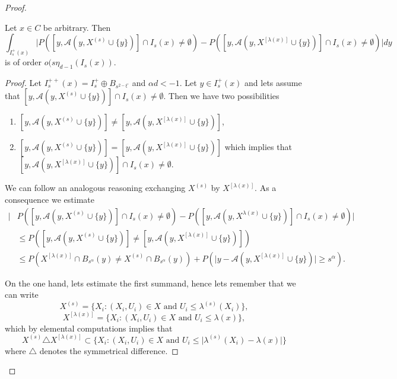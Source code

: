 \begin{proof}
\begin{lem}\label{lem2.5} Let $x\in C$ be arbitrary. Then 
\small $$\int_{I^+_s(x)}\vert P([y, \mathcal{A}(y,X^{(s)}\cup\lbrace y\rbrace)]\cap I_s(x)\neq \emptyset)-P([y, \mathcal{A}(y,X^{[\lambda(x)]}\cup\lbrace y\rbrace)]\cap I_s(x)\neq \emptyset)\vert dy$$
\normalsize
is of order $o(s\eta_{d-1}(I_s(x))$.
\end{lem}
\begin{proof}
Let $I_s^{++}(x)=I_s^+\oplus B_{s^{2-\xi'}}$ and $\alpha d<-1$. Let $y\in I_s^+(x)$ and lets assume that $[y, \mathcal{A}(y,X^{(s)}\cup\lbrace y\rbrace)]\cap I_s(x)\neq \emptyset$. Then we have two possibilities
\begin{enumerate}
\item $[y, \mathcal{A}(y,X^{(s)}\cup\lbrace y\rbrace)]\neq [y, \mathcal{A}(y,X^{[\lambda (x)]}\cup\lbrace y\rbrace)]$,
\item $[y, \mathcal{A}(y,X^{(s)}\cup\lbrace y\rbrace)]= [y, \mathcal{A}(y,X^{[\lambda (x)]}\cup\lbrace y\rbrace)]$ which implies that\\ $[y, \mathcal{A}(y,X^{[\lambda (x)]}\cup\lbrace y\rbrace)]\cap I_s(x)\neq \emptyset$.
\end{enumerate}
We can follow an analogous reasoning exchanging $X^{(s)}$ by $X^{[\lambda (x)]}$. As a consequence we estimate
\begin{align}
\vert &P([y, \mathcal{A}(y,X^{(s)}\cup\lbrace y\rbrace)]\cap I_s(x)\neq \emptyset)-P([y, \mathcal{A}(y,X^{\lambda(x)}\cup\lbrace y\rbrace)]\cap I_s(x)\neq \emptyset)\vert\nonumber\\
&\leq P([y, \mathcal{A}(y,X^{(s)}\cup\lbrace y\rbrace)]\neq [y, \mathcal{A}(y,X^{[\lambda (x)]}\cup\lbrace y\rbrace)])\nonumber\\
&\leq P(X^{[\lambda (x)]}\cap B_{s^\alpha}(y)\neq X^{(s)}\cap B_{s^\alpha}(y))+P(\vert y-\mathcal{A}(y, X^{[\lambda(x)]}\cup\lbrace y\rbrace)\vert\geq s^{\alpha}).\nonumber
\end{align}

On the one hand, lets estimate the first summand, hence lets remember that we can write 
$$X^{(s)}=\lbrace X_i:(X_i, U_i)\in X\mbox{ and }U_i\leq\lambda^{(s)}(X_i)\rbrace, $$
$$X^{[\lambda(x)]}=\lbrace X_i:(X_i, U_i)\in X\mbox{ and }U_i\leq\lambda (x)\rbrace,$$
which by elemental computations implies that $$X^{(s)}\triangle X^{[\lambda(x)]}\subset\lbrace X_i:(X_i, U_i)\in X\mbox{ and }U_i\leq\vert\lambda^{(s)}(X_i)-\lambda(x)\vert\rbrace$$ where $\triangle$ denotes the symmetrical difference.


\end{proof}
\end{proof}
